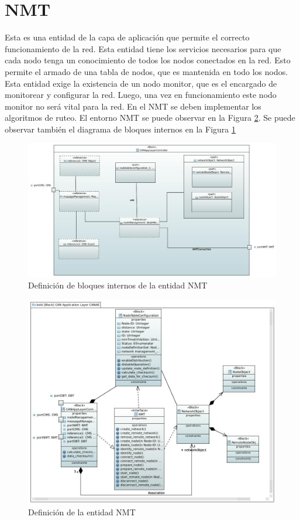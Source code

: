 \section{NMT}\label{Appendix:NMT}
Esta es una entidad de la capa de aplicación que permite el correcto
funcionamiento de la red. Esta entidad tiene los servicios necesarios para que
cada nodo tenga un conocimiento de todos los nodos conectados en la red. Esto
permite el armado de una tabla de nodos, que es mantenida en todo los
nodos. Esta entidad exige la existencia de un nodo monitor, que es el encargado
de monitorear y configurar la red. Luego, una vez en funcionamiento este nodo
monitor no será vital para la red. En el NMT se deben implementar los
algoritmos de ruteo. El entorno NMT se puede observar en la Figura
\ref{fig:NMT}. Se puede observar también el diagrama de bloques internos en
la Figura \ref{fig:NMTInterno}

\begin{figure}[h!]
 \centering
 \includegraphics[scale=0.4]{images/Secciones/AppendixA/CANae_Application_Layer_Controller.JPG}
  \caption{Definición de bloques internos de la entidad NMT}
\label{fig:NMTInterno}
\end{figure} 

\begin{figure}[h!]
 \centering
 \includegraphics[scale=0.4]{images/Secciones/AppendixA/NMT.JPG}
  \caption{Definición de la entidad NMT}
\label{fig:NMT}
\end{figure} 


